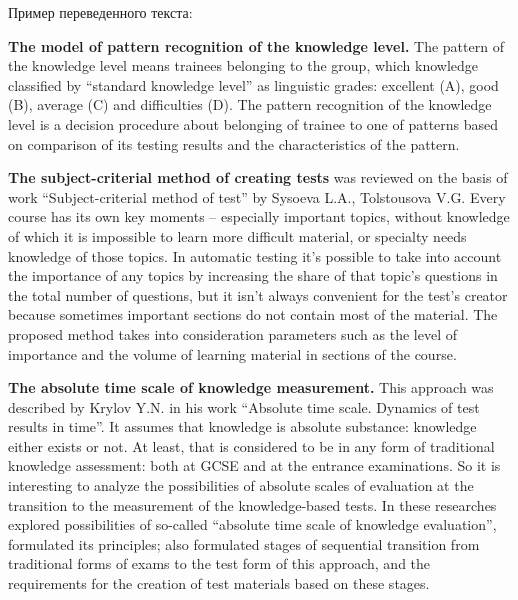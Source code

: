 \newpage
\normalsize
Пример переведенного текста:
\vspace{1.5em}

\small

\textbf{The model of pattern recognition of the knowledge level.} The pattern of the knowledge level means trainees belonging to the group, which knowledge classified by ``standard knowledge level'' as linguistic grades: excellent (A), good (B), average (C) and difficulties (D). The pattern recognition of the knowledge level is a decision procedure about belonging of trainee to one of patterns based on comparison of its testing results and the characteristics of the pattern.

\textbf{The subject-criterial method of creating tests} was reviewed on the basis of work ``Subject-criterial method of test'' by Sysoeva L.A., Tolstousova V.G. Every course has its own key moments – especially important topics, without knowledge of which it is impossible to learn more difficult material, or specialty needs knowledge of those topics. In automatic testing it’s possible to take into account the importance of any topics by increasing the share of that topic’s questions in the total number of questions, but it isn’t always convenient for the test’s creator because sometimes important sections do not contain most of the material. The proposed method takes into consideration parameters such as the level of importance and the volume of learning material in sections of the course.

\textbf{The absolute time scale of knowledge measurement.} This approach was described by Krylov Y.N. in his work ``Absolute time scale. Dynamics of test results in time''. It assumes that knowledge is absolute substance: knowledge either exists or not. At least, that is considered to be in any form of traditional knowledge assessment: both at GCSE and at the entrance examinations. So it is interesting to analyze the possibilities of absolute scales of evaluation at the transition to the measurement of the knowledge-based tests. In these researches explored possibilities of so-called ``absolute time scale of knowledge evaluation'', formulated its principles; also formulated stages of sequential transition from traditional forms of exams to the test form of this approach, and the requirements for the creation of test materials based on these stages.

